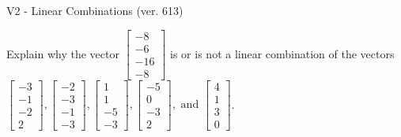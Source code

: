 \begin{exercise}
  \begin{exerciseTitle}V2 - Linear Combinations (ver. 613)\end{exerciseTitle}
  \begin{exerciseStatement}
    Explain why the vector \(\left[\begin{array}{c}
-8 \\
-6 \\
-16 \\
-8
\end{array}\right]\)  is or is not a linear 
	combination of the vectors \(\left[\begin{array}{c}
-3 \\
-1 \\
-2 \\
2
\end{array}\right] , \left[\begin{array}{c}
-2 \\
-3 \\
-1 \\
-3
\end{array}\right] , \left[\begin{array}{c}
1 \\
1 \\
-5 \\
-3
\end{array}\right] , \left[\begin{array}{c}
-5 \\
0 \\
-3 \\
2
\end{array}\right] , \text{ and } \left[\begin{array}{c}
4 \\
1 \\
3 \\
0
\end{array}\right]\).
	



\end{exerciseStatement}
\end{exercise}

